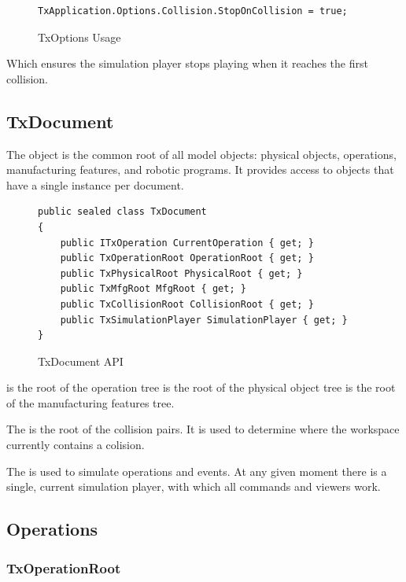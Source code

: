 \begin{figure}[H]
    \caption{TxOptions Usage}
    \centering
    \begin{verbatim}
TxApplication.Options.Collision.StopOnCollision = true;
    \end{verbatim}
    \label{fig:CodeStopOnCollision}
\end{figure}


Which ensures the simulation player stops playing when it reaches the first collision.

\subsection{TxDocument}

The  object is the common root of all model objects: physical
objects, operations, manufacturing features, and robotic programs. It provides
access to objects that have a single instance per document.

\begin{figure}[H]
    \caption{TxDocument API}
    \centering
    \begin{verbatim}
public sealed class TxDocument
{
    public ITxOperation CurrentOperation { get; }
    public TxOperationRoot OperationRoot { get; }
    public TxPhysicalRoot PhysicalRoot { get; }
    public TxMfgRoot MfgRoot { get; }
    public TxCollisionRoot CollisionRoot { get; }
    public TxSimulationPlayer SimulationPlayer { get; }
}
    \end{verbatim}
    \label{fig:CodeTxDocument}
\end{figure}

 is the root of the operation tree
 is the root of the physical object tree
 is the root of the manufacturing features tree.

The  is the root of the collision pairs.
It is used to determine where the workspace currently contains a colision.

The  is used to simulate operations and events.
At any given moment there is a single, current simulation player, with which all commands and viewers work.

\subsection{Operations}

\subsubsection{TxOperationRoot}

